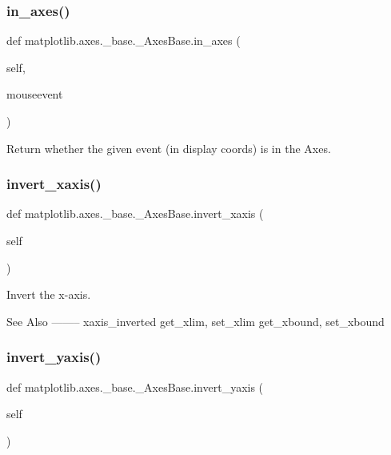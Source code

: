 \subsubsection{\texorpdfstring{in\+\_\+axes()}{in\_axes()}}
{\footnotesize\ttfamily def matplotlib.\+axes.\+\_\+base.\+\_\+\+Axes\+Base.\+in\+\_\+axes (\begin{DoxyParamCaption}\item[{}]{self,  }\item[{}]{mouseevent }\end{DoxyParamCaption})}

\begin{DoxyVerb}Return whether the given event (in display coords) is in the Axes.
\end{DoxyVerb}
 \mbox{\label{classmatplotlib_1_1axes_1_1__base_1_1__AxesBase_a89ad257422c8025445e6289a5a2caa84}} 
\subsubsection{\texorpdfstring{invert\+\_\+xaxis()}{invert\_xaxis()}}
{\footnotesize\ttfamily def matplotlib.\+axes.\+\_\+base.\+\_\+\+Axes\+Base.\+invert\+\_\+xaxis (\begin{DoxyParamCaption}\item[{}]{self }\end{DoxyParamCaption})}

\begin{DoxyVerb}Invert the x-axis.

See Also
--------
xaxis_inverted
get_xlim, set_xlim
get_xbound, set_xbound
\end{DoxyVerb}
 \mbox{\label{classmatplotlib_1_1axes_1_1__base_1_1__AxesBase_a79aa044b8315ccf45e421b88f4e1a1c3}} 
\subsubsection{\texorpdfstring{invert\+\_\+yaxis()}{invert\_yaxis()}}
{\footnotesize\ttfamily def matplotlib.\+axes.\+\_\+base.\+\_\+\+Axes\+Base.\+invert\+\_\+yaxis (\begin{DoxyParamCaption}\item[{}]{self }\end{DoxyParamCaption})}

